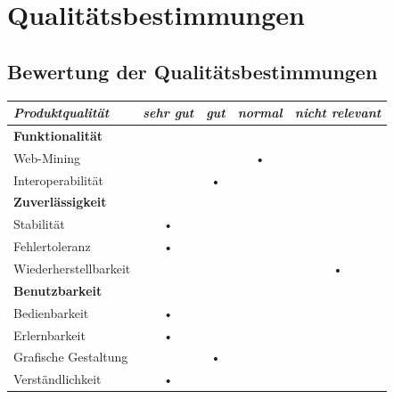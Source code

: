\documentclass[10pt]{scrreprt}
\begin{document}
\chapter{Qualitätsbestimmungen}



\section{Bewertung der Qualitätsbestimmungen}
\vspace{1cm}
\begin{center}
\begin{tabular}{lcccc}
\hline 
\rule[-1ex]{0pt}{4ex} \textit{Produktqualität} & \textit{sehr gut} & \textit{gut} & \textit{normal} & \textit{nicht relevant} \\ 
\hline 
\rule[-1ex]{0pt}{4ex} \textbf{Funktionalität} &  &  &  &  \\ 
\rule[-1ex]{0pt}{4ex} \hspace{10pt} Web-Mining & &  & • & \\ 
\rule[-1ex]{0pt}{4ex} \hspace{10pt} Interoperabilität & & • & & \\ 

\hline 
\rule[-1ex]{0pt}{4ex} \textbf{Zuverlässigkeit} &  &  &  &  \\ 
\rule[-1ex]{0pt}{4ex} \hspace{10pt} Stabilität & • & & & \\ 
\rule[-1ex]{0pt}{4ex} \hspace{10pt} Fehlertoleranz & • & & & \\ 
\rule[-1ex]{0pt}{4ex} \hspace{10pt} Wiederherstellbarkeit &  &  &  & • \\ 

\hline 
\rule[-1ex]{0pt}{4ex} \textbf{Benutzbarkeit} &  &  &  &  \\ 
\rule[-1ex]{0pt}{4ex} \hspace{10pt} Bedienbarkeit & • & & & \\ 
\rule[-1ex]{0pt}{4ex} \hspace{10pt} Erlernbarkeit & • & & & \\ 
\rule[-1ex]{0pt}{4ex} \hspace{10pt} Grafische Gestaltung & & • & & \\ 
\rule[-1ex]{0pt}{4ex} \hspace{10pt} Verständlichkeit & • & & & \\ 


\end{tabular}
\end{center}
\end{document}
